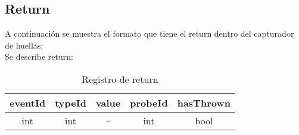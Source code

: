 \documentclass[10pt,a4paper]{article}
\begin{document}
\subsection{Return}

A continuación se muestra el formato que tiene el return dentro del capturador de huellas:\\

Se describe return:\\

\begin{table}[!h]
\begin{center}
\begin{tabular}{| c | c | c | c | c |}
\hline
eventId & typeId & value & probeId & hasThrown \\
\hline
int & int & --\footnotemark[1] & int & bool\\
\hline
\end{tabular}
\caption{Registro de return} 
\end{center}
\end{table}

\end{document}
